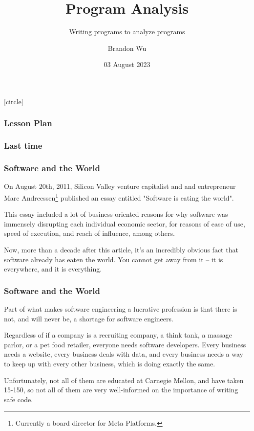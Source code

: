 \documentclass[aspectratio=169]{beamer}
\title{Program Analysis} %
\subtitle{Writing programs to analyze programs} %
\date{03 August 2023} %
\author{Brandon Wu} %
\newif\ifcolorlambda
\begin{document}
\ifweb
    \renewcommand{\pause}{}
\fi

[circle]

{
\begin{frame}[plain]
    \colorlambdatrue
    \titlepage
\end{frame}
}

\begin{frame}[fragile]
  \frametitle{Lesson Plan}

  \tableofcontents
\end{frame}

\begin{frame}[fragile]
  \frametitle{Last time}
\end{frame}


\begin{frame}[fragile]
  \frametitle{Software and the World}

  On August 20th, 2011, Silicon Valley venture capitalist and and
  entrepreneur Marc Andreessen\footnote{Currently a board director for Meta Platforms.} published an essay entitled
  "Software is eating the world".

  This essay included a lot of business-oriented reasons for why software
  was immensely disrupting each individual economic sector, for reasons of
  ease of use, speed of execution, and reach of influence, among others.

  Now, more than a decade after this article, it's an incredibly obvious fact that
  software already has eaten the world. You cannot get away from it -- it is
  everywhere, and it is everything.
\end{frame}

\begin{frame}[fragile]
  \frametitle{Software and the World}

  Part of what makes software engineering a lucrative profession is that there
  is not, and will never be, a shortage for software engineers.

  Regardless of if a company is a recruiting company, a think tank, a massage parlor,
  or a pet food retailer, everyone needs software developers. Every business needs
  a website, every business deals with data, and every business needs a way to
  keep up with every other business, which is doing exactly the same.

  Unfortunately, not all of them are educated at Carnegie Mellon, and
  have taken 15-150, so not all of them are very well-informed on the
  importance of writing safe code.
\end{frame}
\end{document}
